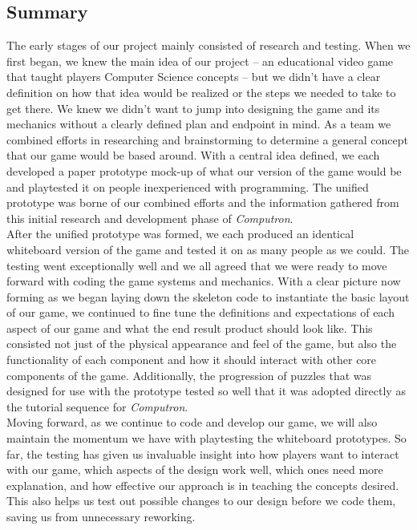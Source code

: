 \subsection{Summary}
The early stages of our project mainly consisted of research and testing. When we first began, we knew the main idea of our project -- an educational video game that taught players Computer Science concepts -- but we didn't have a clear definition on how that idea would be realized or the steps we needed to take to get there. We knew we didn't want to jump into designing the game and its mechanics without a clearly defined plan and endpoint in mind. As a team we combined efforts in researching and brainstorming to determine a general concept that our game would be based around. With a central idea defined, we each developed a paper prototype mock-up of what our version of the game would be and playtested it on people inexperienced with programming. The unified prototype was borne of our combined efforts and the information gathered from this initial research and development phase of \textit{Computron}.\\

After the unified prototype was formed, we each produced an identical whiteboard version of the game and tested it on as many people as we could. The testing went exceptionally well and we all agreed that we were ready to move forward with coding the game systems and mechanics. With a clear picture now forming as we began laying down the skeleton code to instantiate the basic layout of our game, we continued to fine tune the definitions and expectations of each aspect of our game and what the end result product should look like. This consisted not just of the physical appearance and feel of the game, but also the functionality of each component and how it should interact with other core components of the game. Additionally, the progression of puzzles that was designed for use with the prototype tested so well that it was adopted directly as the tutorial sequence for \textit{Computron}.\\

Moving forward, as we continue to code and develop our game, we will also maintain the momentum we have with playtesting the whiteboard prototypes. So far, the testing has given us invaluable insight into how players want to interact with our game, which aspects of the design work well, which ones need more explanation, and how effective our approach is in teaching the concepts desired. This also helps us test out possible changes to our design before we code them, saving us from unnecessary reworking.\\

